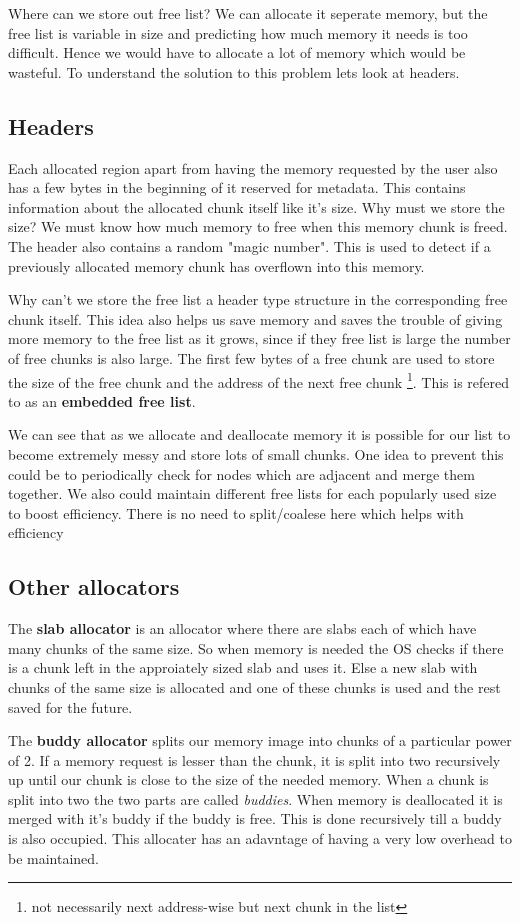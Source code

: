 \documentclass[12pt]{article}
\begin{document}
Where can we store out free list? We can allocate it seperate memory, but the free list is variable in size and predicting how much memory it needs is too difficult. Hence we would have to allocate a lot of memory which would be wasteful. To understand the solution to this problem lets look at headers.
\subsection{Headers}
Each allocated region apart from having the memory requested by the user also has a few bytes in the beginning of it reserved for metadata. This contains information about the allocated chunk itself like it's size.
Why must we store the size? We must know how much memory to free when this memory chunk is freed. The header also contains a random "magic number". This is used to detect if a previously allocated memory chunk has overflown into this memory.

Why can't we store the free list a header type structure in the corresponding free chunk itself. This idea also helps us save memory and saves the trouble of giving more memory to the free list as it grows, since if they free list is large the number of free chunks is also large.
The first few bytes of a free chunk are used to store the size of the free chunk and the address of the next free chunk \footnote{not necessarily next address-wise but next chunk in the list}. This is refered to as an \textbf{embedded free list}.

We can see that as we allocate and deallocate memory it is possible for our list to become extremely messy and store lots of small chunks. One idea to prevent this could be to periodically check for nodes which are adjacent and merge them together. We also could maintain different free lists for 
each popularly used size to boost efficiency. There is no need to split/coalese here which helps with efficiency

\subsection{Other allocators}
The \textbf{slab allocator} is an allocator where there are slabs each of which have many chunks of the same size. So when memory is needed the OS checks if there is a chunk left in the approiately sized slab
and uses it. Else a new slab with chunks of the same size is allocated and one of these chunks is used and the rest saved for the future.

The \textbf{buddy allocator} splits our memory image into chunks of a particular power of 2. If a memory request is lesser than the chunk, it is split
into two recursively up until our chunk is close to the size of the needed memory. When a chunk is split into two the two parts are called \textit{buddies}. When memory is 
deallocated it is merged with it's buddy if the buddy is free. This is done recursively till a buddy is also occupied. This allocater has an adavntage of having a very low overhead to be maintained. 
\end{document}
